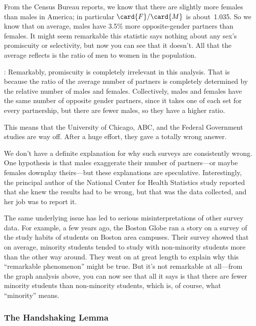From the Census Bureau reports, we know that there are slightly more
females than males in America; in particular $\card{F} / \card{M}$ is
about~1.035.  So we know that on average, males have 3.5\% more
opposite-gender partners than females.   It might seem
remarkable this statistic says nothing about any sex's promiscuity or
selectivity, but now you can see that it doesn't.  All that the average
reflects is the ratio of men to women in the population.
\begin{editingnotes}
: Remarkably, promiscuity is completely irrelevant in this
  analysis.  That is because the ratio of the average number of
  partners is completely determined by the relative number of males
  and females.  Collectively, males and females have the same number
  of opposite gender partners, since it takes one of each set for
  every partnership, but there are fewer males, so they have a higher
  ratio.
\end{editingnotes}
This means that the University of Chicago, ABC, and the Federal
Government studies are way off.  After a huge effort, they gave a
totally wrong answer.

We don't have a definite explanation for why such surveys are consistently
wrong.  One hypothesis is that males exaggerate their number of
partners---or maybe females downplay theirs---but these explanations are
speculative.  Interestingly, the principal author of the National Center
for Health Statistics study reported that she knew the results had to be
wrong, but that was the data collected, and her job was to report it.

The same underlying issue has led to serious misinterpretations of other
survey data.  For example, a few years ago, the Boston Globe ran a story
on a survey of the study habits of students on Boston area campuses.
Their survey showed that on average, minority students tended to study
with non-minority students more than the other way around.  They went on
at great length to explain why this ``remarkable phenomenon'' might be
true.  But it's not remarkable at all---from the graph analysis above, you
can now see that all it says is that there are fewer minority students
than non-minority students, which is, of course, what ``minority'' means.

\subsubsection{The Handshaking Lemma}

